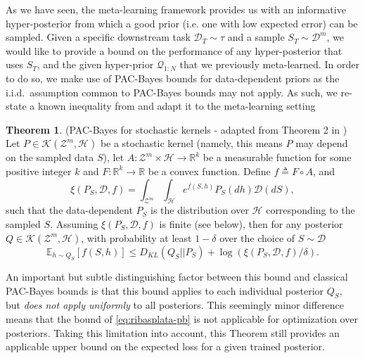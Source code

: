 \documentclass{article} %
\theoremstyle{definition}
\newtheorem{theorem}{Theorem}[section]
\newcommand{\Expect}[2]{\mathbb{E}_{#1}\left [#2 \right ]}
\begin{document}
As we have seen, the meta-learning framework provides us with an informative hyper-posterior from which a good prior (i.e.\! one with low expected error) can be sampled. Given a specific downstream task $\mathcal{D}_T\sim \tau$ and a sample $S_T\sim \mathcal{D}^m$, we would like to provide a bound on the performance of any hyper-posterior that uses $S_T$, and the given hyper-prior $\mathcal{Q}_{1:N}$ that we previously meta-learned. In order to do so, we make use of PAC-Bayes bounds for data-dependent priors as the i.i.d.\ assumption common to PAC-Bayes bounds may not apply. As such, we re-state a known inequality from \citet{Rivasplata2020} and adapt it to the meta-learning setting

\begin{theorem} (PAC-Bayes for stochastic kernels - adapted from Theorem 2 in \citet{Rivasplata2020}) \label{thm:rivasplata-pb}
	Let $P\in \mathcal{K}(\mathcal{Z}^m, \mathcal{H})$ be a stochastic kernel (namely, this means $P$ may depend on the sampled data $S$), let $A: \mathcal{Z}^m\times \mathcal{H}\rightarrow \mathbb{R}^k$ be a measurable function for some positive integer $k$ and $F:\mathbb{R}^k\rightarrow \mathbb{R}$ be a convex function.
	Define $f\triangleq F\circ A$, and
	$$
	\xi(P_S, \mathcal{D}, f)=\int_{\mathcal{Z}^m}\int_{\mathcal{H}}e^{f(S, h)}P_S(dh)\mathcal{D}(dS),
	$$
	such that the data-dependent $P_S$ is the distribution over $\mathcal{H}$ corresponding to the sampled $S$. Assuming $\xi(P_S, \mathcal{D}, f)$ is finite (see below), then for any posterior $Q\in \mathcal{K}(\mathcal{Z}^m, \mathcal{H})$, with probability at least $1-\delta$ over the choice of $S\sim \mathcal{D}$
	\begin{equation} \label{eq:ribasplata-pb}
	\Expect{h\sim Q_S}{f(S, h)} \leq D_{KL}(Q_S||P_S)+\log\left (\xi(P_S, \mathcal{D}, f)/\delta\right ) .
	\end{equation}
\end{theorem}

An important but subtle distinguishing factor between this bound and classical PAC-Bayes bounds is that this bound applies to each individual posterior $Q_S$, but \emph{does not apply uniformly} to all posteriors. This seemingly minor difference means that the bound of \eqref{eq:ribasplata-pb} is not applicable for optimization over posteriors. Taking this limitation into account, this Theorem still provides an applicable upper bound on the expected loss for a given trained posterior. 
\end{document}
